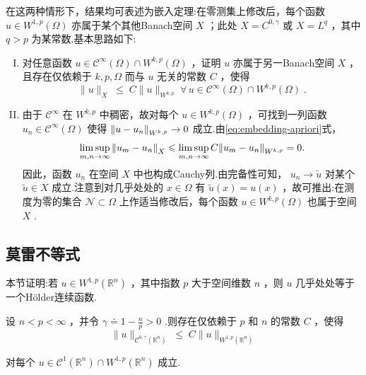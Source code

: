 在这两种情形下，结果均可表述为嵌入定理:在零测集上修改后，每个函数 $u \in  {W}^{1,p}\left( \Omega \right)$ 亦属于某个其他Banach空间 $X$ ；此处 $X = {C}^{0,\gamma }$ 或 $X = {L}^{q}$ ，其中 $q > p$ 为某常数.基本思路如下:
\begin{enumerate}[(I)]
    \item {}对任意函数 $u \in  {\mathcal{C}}^{\infty }\left( \Omega \right)  \cap  {W}^{k,p}\left( \Omega \right)$ ，证明 $u$ 亦属于另一Banach空间 $X$ ，且存在仅依赖于 $k,p,\Omega$ 而与 $u$ 无关的常数 $C$ ，使得
\begin{equation}\tag{8.42}\label{eq:embedding-apriori}
\| u{\| }_{X}\; \leq  \;C\| u{\| }_{{W}^{k,p}}\;\forall\,u \in  {\mathcal{C}}^{\infty }\left( \Omega \right)  \cap  {W}^{k,p}\left( \Omega \right) \;.
\end{equation}
    \item {}由于 ${\mathcal{C}}^{\infty }$ 在 ${W}^{k,p}$ 中稠密，故对每个 $u \in  {W}^{k,p}\left( \Omega \right)$ ，可找到一列函数 ${u}_{n} \in  {\mathcal{C}}^{\infty }\left( \Omega \right)$ 使得 $\norm{u - {u}_{n}}_{{W}^{k,p}} \rightarrow  0$ 成立.由\eqref{eq:embedding-apriori}式，
    \[
    \limsup_{{m,n \rightarrow  \infty }}{\norm{u_{m} - {u}_{n}}}_{X} \leqslant  \limsup_{{m,n \rightarrow  \infty }}C{\norm{u_{m} - {u}_{n}}}_{{W}^{k,p}} = 0.
    \]
    因此，函数 ${u}_{n}$ 在空间 $X$ 中也构成Cauchy列.由完备性可知， ${u}_{n} \rightarrow  \widetilde{u}$ 对某个 $\widetilde{u} \in  X$ 成立.注意到对几乎处处的 $x \in  \Omega$ 有 $\widetilde{u}\left( x\right)  = u\left( x\right)$ ，故可推出:在测度为零的集合 $\mathcal{N} \subset  \Omega$ 上作适当修改后，每个函数 $u \in  {W}^{k,p}\left( \Omega \right)$ 也属于空间 $X$ .
\end{enumerate}



\subsection{莫雷不等式}

本节证明:若 $u \in  {W}^{1,p}\left( {\mathbb{R}}^{n}\right)$ ，其中指数 $p$ 大于空间维数 $n$ ，则 $u$ 几乎处处等于一个Hölder连续函数.
\begin{theorem}[莫雷不等式]\label{thm:morrey-inequality}
设 $n < p < \infty$ ，并令 $\gamma  \doteq  1 - \frac{n}{p} > 0$ .则存在仅依赖于 $p$ 和 $n$ 的常数 $C$ ，使得
\begin{equation}\tag{8.43}\label{eq:morrey-inequality}
\| u{\| }_{{\mathcal{C}}^{0,\gamma }\left( {\mathbb{R}}^{n}\right) }\; \leq  \;C\| u{\| }_{{W}^{1,p}\left( {\mathbb{R}}^{n}\right) }
\end{equation}

对每个 $u \in  {\mathcal{C}}^{1}\left( {\mathbb{R}}^{n}\right)  \cap  {W}^{1,p}\left( {\mathbb{R}}^{n}\right)$ 成立.
\end{theorem}

